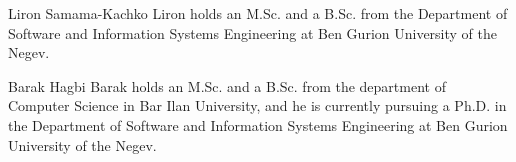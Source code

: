 \documentclass[journal]{IEEEtran}
\begin{document}




%

% 


\begin{IEEEbiographynophoto}{Liron Samama-Kachko}
Liron holds an M.Sc. and a B.Sc. from the Department of Software and Information Systems Engineering at Ben Gurion University of the Negev.
\end{IEEEbiographynophoto}


\begin{IEEEbiographynophoto}{Barak Hagbi}
Barak holds an M.Sc. and a B.Sc. from the department of Computer Science in Bar Ilan University, and he is currently pursuing a Ph.D. in the Department of Software and Information Systems Engineering at Ben Gurion University of the Negev.
\end{IEEEbiographynophoto}
\end{document}
